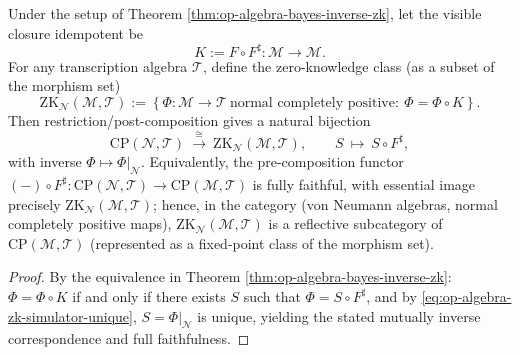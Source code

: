 \begin{corollary}\label{cor:op-algebra-zk-reflector-bayes}
Under the setup of Theorem \ref{thm:op-algebra-bayes-inverse-zk}, let the visible closure idempotent be
\[
K:=F\circ F^\sharp:\mathcal{M}\to\mathcal{M}.
\]
For any transcription algebra \(\mathcal{T}\), define the zero-knowledge class (as a subset of the morphism set)
\[
\mathrm{ZK}_{\mathcal{N}}(\mathcal{M},\mathcal{T})
:=\left\{\Phi:\mathcal{M}\to\mathcal{T}\ \text{normal completely positive}:\ \Phi=\Phi\circ K\right\}.
\]
Then restriction/post-composition gives a natural bijection
\[
\mathrm{CP}(\mathcal{N},\mathcal{T})\ \xrightarrow{\ \cong\ }\ \mathrm{ZK}_{\mathcal{N}}(\mathcal{M},\mathcal{T}),
\qquad
S\ \longmapsto\ S\circ F^\sharp,
\]
with inverse \(\Phi\mapsto \Phi|_{\mathcal{N}}\).
Equivalently, the pre-composition functor \((-) \circ F^\sharp:\mathrm{CP}(\mathcal{N},\mathcal{T})\to \mathrm{CP}(\mathcal{M},\mathcal{T})\) is fully faithful, with essential image precisely \(\mathrm{ZK}_{\mathcal{N}}(\mathcal{M},\mathcal{T})\);
hence, in the category (von Neumann algebras, normal completely positive maps), \(\mathrm{ZK}_{\mathcal{N}}(\mathcal{M},\mathcal{T})\) is a reflective subcategory of \(\mathrm{CP}(\mathcal{M},\mathcal{T})\) (represented as a fixed-point class of the morphism set).
\end{corollary}
\begin{proof}
By the equivalence in Theorem \ref{thm:op-algebra-bayes-inverse-zk}: \(\Phi=\Phi\circ K\) if and only if there exists \(S\) such that \(\Phi=S\circ F^\sharp\),
and by \eqref{eq:op-algebra-zk-simulator-unique}, \(S=\Phi|_{\mathcal{N}}\) is unique,
yielding the stated mutually inverse correspondence and full faithfulness. \qedhere
\end{proof}

